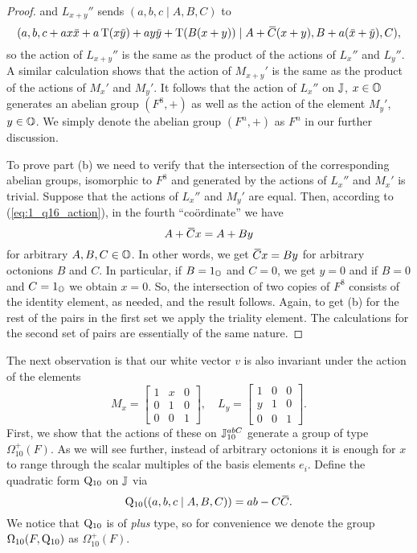 \begin{proof}
    and $L_{x+y}''$ sends $(a,b,c\mid A,B,C)$ to
    \begin{equation*}
        (a,b,c+ax\ovx  + a\Tr(x\ovy ) + ay\ovy  + \Tr(B(x+y)) \mid
        A + \ovC (x+y), B+a(\ovx  + \ovy ), C),
    \end{equation*}
    so the action of $L_{x+y}''$ is the same as the product of the actions of $L_x''$ and
    $L_y''$. A similar calculation shows that the action of $M_{x+y}'$ is the same
    as the product of the actions of $M_x'$ and $M_y'$. It follows that the action of 
    $L_x''$ on $\mathbb{J}$, $x\in \mathbb{O}$ generates an abelian group $(F^8,+)$ as well as the action
    of the element $M_y'$, $y \in \mathbb{O}$. We simply denote the abelian group $(F^n,+)$ as $F^n$ in
    our further discussion. 
    
    To prove part (b) we need to verify that the intersection of the corresponding abelian groups, isomorphic to $F^8$ and generated by the actions of $L_x''$ and $M_x'$ is trivial. Suppose that the
    actions of $L_x''$ and $M_y'$ are equal. Then, according to (\ref{eq:1_q16_action}), 
    in the fourth ``co{\"o}rdinate'' we have
    \begin{equation*}
    	 A+\mathord{\mbox{\hspace*{0pt}}\,\overline{\!C\!\!\;}\!\:}\mbox{\hspace*{0pt}} x = A + B y
    \end{equation*}
    for arbitrary $A,B,C \in \mathbb{O}$. In other words, we get $\mathord{\mbox{\hspace*{0pt}}\,\overline{\!C\!\!\;}\!\:}\mbox{\hspace*{0pt}} x = B y$ for arbitrary octonions
    $B$ and $C$. In particular, if $B = 1_{\mathbb{O}}$ and $C = 0$, we get $y = 0$ and if
    $B = 0$ and $C = 1_{\mathbb{O}}$ we obtain $x = 0$. So, the intersection of two copies of
    $F^8$ consists of the identity element, as needed, and the result follows. 
    Again, to get (b) for the rest of the pairs in the first set we apply the 
    triality element. The calculations for the second set of pairs are essentially
    of the same nature. 
\end{proof}

The next observation is that our white vector $v$ is also invariant under the action of the
elements
    \begin{equation}
        M_x = \begin{bmatrix}
            1&x&0\\
            0&1&0\\
            0&0&1
        \end{bmatrix},\quad 
        L_y = \begin{bmatrix}
            1&0&0\\
            y&1&0\\
            0&0&1
        \end{bmatrix}.
    \end{equation}
First, we show that the actions of these on $\mathbb{J}_{10}^{abC}$ generate a group 
of type $\Omega_{10}^+(F)$. As we will see further, instead of arbitrary octonions
it is enough for $x$ to range through the scalar multiples of the basis elements $e_i$.
Define the quadratic form $\mathord{\mathrm{Q}}_{10}$ on $\mathbb{J}$ via
\begin{equation}
	\mathord{\mathrm{Q}}_{10}((a,b,c\mid A,B,C)) = ab - C\mathord{\mbox{\hspace*{0pt}}\,\overline{\!C\!\!\;}\!\:}\mbox{\hspace*{0pt}}. 
\end{equation}
We notice that $\mathord{\mathrm{Q}}_{10}$ is of \textit{plus} type, so for convenience we
denote the group $\Omega_{10}(F,\mathord{\mathrm{Q}}_{10})$ as $\Omega_{10}^+(F)$. 

